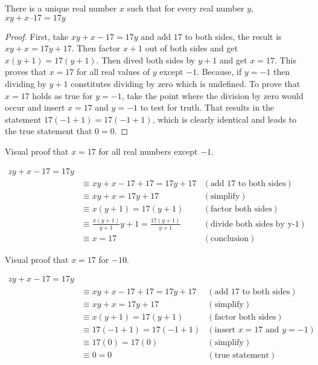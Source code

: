 
\begin{theorem}
  There is a unique real number $x$ such that for every real number $y$, $xy+x–17=17y$
\end{theorem}

\begin{proof}
  First, take $xy+x-17=17y$ and add $17$ to both sides, the result is
  $xy+x=17y+17$. Then factor $x+1$ out of both sides and get $x(y+1)=17(y+1)$.
  Then dived both sides by $y+1$ and get $x=17$. This proves that $x=17$ for all
  real values of $y$ except $-1$. Because, if $y=-1$ then dividing by $y+1$
  constitutes dividing by zero which is undefined. To prove that $x=17$ holds as
  true for $y=-1$, take the point where the division by zero would occur and
  insert $x=17$ and $y=-1$ to test for truth. That results in the statement
  $17(-1+1)=17(-1+1)$, which is clearly identical and leads to the true
  statement that $0=0$.
\end{proof}

Visual proof that $x=17$ for all real numbers except $-1$.

\begin{align*}
  zy+x-17=17y\\
  &\equiv xy+x-17+17=17y+17 &(\textrm{add 17 to both sides})\\
  &\equiv xy+x=17y+17 &(\textrm{simplify})\\
  &\equiv x(y+1)=17(y+1) &(\textrm{factor both sides})\\
  &\equiv \frac{x(y+1)}{y+1}{y+1}=\frac{17(y+1)}{y+1} &(\textrm{divide both
  sides by y-1})\\
  &\equiv x=17 &(\textrm{conclusion})
\end{align*}


Visual proof that $x=17$ for $-10$.

\begin{align*}
  zy+x-17=17y\\
  &\equiv xy+x-17+17=17y+17 &(\textrm{add 17 to both sides})\\
  &\equiv xy+x=17y+17 &(\textrm{simplify})\\
  &\equiv x(y+1)=17(y+1) &(\textrm{factor both sides})\\
  &\equiv 17(-1+1)=17(-1+1) &(\textrm{insert $x=17$ and $y=-1$})\\
  &\equiv 17(0)=17(0) &(\textrm{simplify})\\
  &\equiv 0=0 &(\textrm{true statement})
\end{align*}
